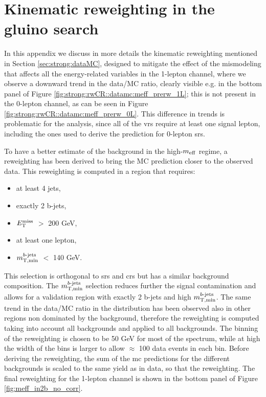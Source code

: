\chapter{Kinematic reweighting in the gluino search}
\label{app:meffrw}

In this appendix we discuss in more details the kinematic reweighting mentioned in Section \ref{sec:strong:dataMC},
designed to mitigate the effect of the mismodeling that affects all the energy-related variables in the 1-lepton channel,
where we observe a downward trend in the data/MC ratio, clearly visible e.g. in the bottom panel of 
Figure \ref{fig:strong:rwCR::datamc:meff_prerw_1L}; this is not present in the 0-lepton channel, as can be seen in 
Figure \ref{fig:strong:rwCR::datamc:meff_prerw_0L}.
This difference in trends is problematic for the analysis, since all of the \glspl{vr} require at least one signal lepton, 
including the ones used to derive the prediction for 0-lepton \glspl{sr}.

To have a better estimate of the background in the high-$m_{\mathrm{eff}}$ regime, a reweighting has been derived to bring the MC prediction closer to the observed data. This reweighting is computed in a region that requires:
\begin{itemize}
\item at least 4 jets,
\item exactly 2 b-jets,
\item $E_{\rm T}^{\mathrm{miss}}$ $>$ 200 GeV,
\item at least one lepton,
\item $m_{\mathrm{T, min}}^{b\textrm{-jets}}$ $<$ 140 GeV.
\end{itemize}

This selection is orthogonal to \glspl{sr} and \glspl{cr} but has a similar background composition. 
The $m_{\mathrm{T, min}}^{b\textrm{-jets}}$ selection reduces further the signal contamination and allows for a validation region with exactly 2 b-jets and high $m_{\mathrm{T, min}}^{b\textrm{-jets}}$. 
The same trend in the data/MC ratio in the \meff distribution has been observed also in other regions non dominated by the 
\ttbar background,
therefore the reweighting is computed taking into account all backgrounds and applied to all backgrounds. 
The binning of the reweighting is chosen to be 50 GeV for most of the \meff spectrum, 
while at high \meff the width of the bins is larger to allow $\approx$ 100 data events in each bin. 
Before deriving the reweighting, the sum of the \gls{mc} predictions for the different backgrounds is scaled to the same yield as in data,
so that the reweighting.
The final reweighting for the 1-lepton channel is shown in the bottom panel of Figure \ref{fig:meff_in2b_no_corr}.

